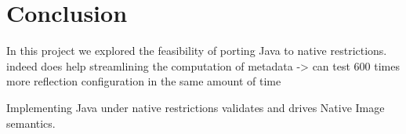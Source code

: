 \chapter{Conclusion}
% 

In this project we explored the feasibility of porting Java to native restrictions. 
indeed does help streamlining the computation of metadata -> can test 600 times more reflection configuration in the same amount of time

Implementing Java under native restrictions validates and drives Native Image semantics.  

% 
